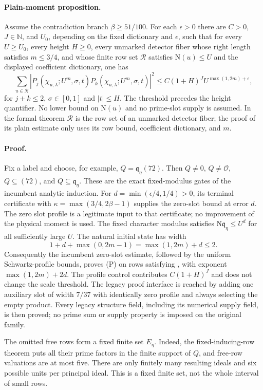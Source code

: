 \paragraph{Plain-moment proposition.}
Assume the contradiction branch $\beta\ge51/100$. For each $\epsilon>0$
there are $C>0$, $J\in\mathbb N$, and $U_0$, depending on the fixed
dictionary and $\epsilon$, such that for every $U\ge U_0$, every height
$H\ge0$, every unmarked detector fiber whose right length satisfies $m\le3/4$,
and whose finite row set $\mathcal R$ satisfies $\mathrm N(u)\le U$ and
the displayed coefficient dictionary, one has
\[
 \sum_{u\in\mathcal R}
 |P_j(\chi_{u,\lambda};U^m,\sigma,t)
  P_k(\chi_{u,\lambda};U^m,\sigma,t)|^2
 \le C(1+H)^J U^{\max(1,2m)+\epsilon},
 \tag{P}
\]
for $j+k\le2$, $\sigma\in[0,1]$ and $|t|\le H$.
The threshold precedes the height quantifier. No lower bound on
$\mathrm N(u)$ and no prime-slot supply is assumed. In the formal theorem
$\mathcal R$ is the row set of an unmarked detector fiber; the proof of its
plain estimate only uses its row bound, coefficient dictionary, and $m$.

\paragraph{Proof.}
Fix a label and choose, for example,
$Q=\mathfrak q_\eta(72)$. Then $Q\ne0$, $Q\ne\mathcal O$,
$Q\subseteq(72)$, and $Q\subseteq\mathfrak q_\eta$. These are the exact
fixed-modulus gates of the incumbent analytic induction. For
$d=\min(\epsilon/4,1/4)>0$, its terminal certificate with
$\kappa=\max(3/4,2\beta-1)$ supplies the zero-slot bound at error $d$.
The zero slot profile is a legitimate input to that certificate; no
improvement of the physical moment is used. The fixed character modulus
satisfies $\mathrm N\mathfrak q_\eta\le U^d$ for all sufficiently large $U$.
The natural initial state has width
\[
 1+d+\max(0,2m-1)=\max(1,2m)+d\le2.
\]
Consequently the incumbent zero-slot estimate, followed by the uniform
Schwartz-profile bounds, proves (P) on rows satisfying
, with exponent $\max(1,2m)+2d$.
The profile control contributes $C(1+H)^J$ and does not change the scale
threshold. The legacy proof interface is reached by adding one auxiliary
slot of width $7/37$ with identically zero profile and always selecting the
empty product. Every legacy structure field, including its numerical
supply field, is then proved; no prime sum or supply property is imposed
on the original family.

The omitted free rows form a fixed finite set $E_\eta$. Indeed, the
fixed-inducing-row theorem puts all their prime factors in the finite
support of $Q$, and free-row valuations are at most five. There are only
finitely many resulting ideals and six possible units per principal ideal.
This is a fixed finite set, not the whole interval of small rows.

